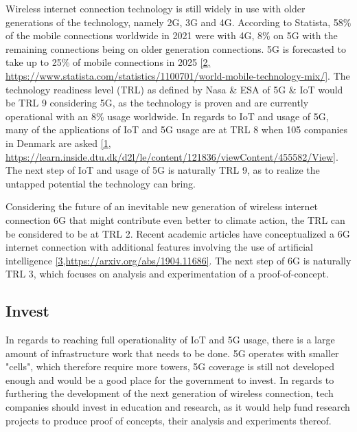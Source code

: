 Wireless internet connection technology is still widely in use with older generations of the technology, namely 2G, 3G and 4G.
According to Statista, 58\% of the mobile connections worldwide in 2021 were with 4G, 8\% on 5G with the remaining connections being on older generation connections.
5G is forecasted to take up to 25\% of mobile connections in 2025 \href{https://www.statista.com/statistics/1100701/world-mobile-technology-mix/}{[2, https://www.statista.com/statistics/1100701/world-mobile-technology-mix/]}.
The technology readiness level (TRL) as defined by Nasa \& ESA of 5G \& IoT would be TRL 9 considering 5G, as the technology is proven and are currently operational with an 8\% usage worldwide.
In regards to IoT and usage of 5G, many of the applications of IoT and 5G usage are at TRL 8 when 105 companies in Denmark are asked \href{https://learn.inside.dtu.dk/d2l/le/content/121836/viewContent/455582/View}{[1, https://learn.inside.dtu.dk/d2l/le/content/121836/viewContent/455582/View]}. The next step of IoT and usage of 5G is naturally TRL 9, as to realize the untapped potential the technology can bring.

Considering the future of an inevitable new generation of wireless internet connection 6G that might contribute even better to climate action, the TRL can be considered to be at TRL 2. 
Recent academic articles have conceptualized a 6G internet connection with additional features involving the use of artificial intelligence \href{https://arxiv.org/abs/1904.11686}{[3,https://arxiv.org/abs/1904.11686]}.
The next step of 6G is naturally TRL 3, which focuses on analysis and experimentation of a proof-of-concept.

\subsection*{Invest}

In regards to reaching full operationality of IoT and 5G usage, there is a large amount of infrastructure work that needs to be done.
5G operates with smaller "cells", which therefore require more towers, 5G coverage is still not developed enough and would be a good place for the government to invest.
In regards to furthering the development of the next generation of wireless connection, tech companies should invest in education and research, as it would help fund research projects to produce proof of concepts, their analysis and experiments thereof.


